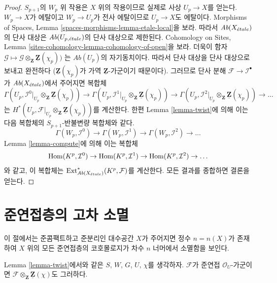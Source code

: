 \begin{proof}
$S_{p + 1}$의 $W_p$ 위 작용은 $X$ 위의 작용이므로 실제로 사상
$U_p \to X$를 얻는다. $W_p \to X$가 에탈이고
$W_p \to U_p$가 전사 에탈이므로 $U_p \to X$도 에탈이다.
Morphisms of Spaces, Lemma \ref{spaces-morphisms-lemma-etale-local}을 보라.
따라서 $\textit{Ab}(X_{\acute{e}tale})$의 단사 대상은
$\textit{Ab}(U_{p, {\acute{e}tale}})$의 단사 대상으로 제한된다.
Cohomology on Sites, Lemma
\ref{sites-cohomology-lemma-cohomology-of-open}을 보라. 더욱이 함자
$\mathcal{G} \mapsto
\mathcal{G} \otimes_\mathbf{Z} \underline{\mathbf{Z}}(\chi_p))$
는 $\textit{Ab}(U_p)$의 자기동치이다. 따라서 단사 대상을 단사
대상으로 보내고 완전하다
($\underline{\mathbf{Z}}(\chi_p)$가 가역
$\underline{\mathbf{Z}}$-가군이기 때문이다). 그러므로 단사 분해
$\mathcal{F} \to \mathcal{I}^\bullet$가 $\textit{Ab}(X_{\acute{e}tale})$에서
주어지면 복합체
$$
\Gamma(U_p,
\mathcal{I}^0|_{U_p} \otimes_\mathbf{Z} \underline{\mathbf{Z}}(\chi_p))
\to
\Gamma(U_p,
\mathcal{I}^1|_{U_p} \otimes_\mathbf{Z} \underline{\mathbf{Z}}(\chi_p))
\to
\Gamma(U_p,
\mathcal{I}^2|_{U_p} \otimes_\mathbf{Z} \underline{\mathbf{Z}}(\chi_p))
\to \ldots
$$
는 $H^*(U_p,
\mathcal{F}|_{U_p} \otimes_\mathbf{Z} \underline{\mathbf{Z}}(\chi_p))$를
계산한다. 한편 Lemma \ref{lemma-twist}에 의해 이는 다음 복합체의
$S_{p + 1}$-반불변량 복합체와 같다.
$$
\Gamma(W_p, \mathcal{I}^0) \to
\Gamma(W_p, \mathcal{I}^1) \to
\Gamma(W_p, \mathcal{I}^2) \to \ldots
$$
Lemma \ref{lemma-compute}에 의해 이는 복합체
$$
\mathop{\mathrm{Hom}}\nolimits(K^p, \mathcal{I}^0) \to
\mathop{\mathrm{Hom}}\nolimits(K^p, \mathcal{I}^1) \to
\mathop{\mathrm{Hom}}\nolimits(K^p, \mathcal{I}^2) \to \ldots
$$
와 같고, 이 복합체는
$\mathop{\mathrm{Ext}}\nolimits^*_{\textit{Ab}(X_{\acute{e}tale})}(K^p, \mathcal{F})$를 계산한다.
모든 결과를 종합하면 결론을 얻는다.
\end{proof}





\section{준연접층의 고차 소멸}
\label{section-higher-vanishing}

\noindent
이 절에서는 준콤팩트하고 준분리인 대수공간 $X$가 주어지면 정수
$n = n(X)$가 존재하여 $X$ 위의 모든 준연접층의 코호몰로지가
차수 $n$ 너머에서 소멸함을 보인다.

\begin{lemma}
\label{lemma-quasi-coherent-twist}
Lemma \ref{lemma-twist}에서와 같은 $S$, $W$, $G$, $U$, $\chi$를
생각하자. $\mathcal{F}$가 준연접 $\mathcal{O}_U$-가군이면
$\mathcal{F} \otimes_{\mathbf{Z}} \underline{\mathbf{Z}}(\chi)$도
그러하다.
\end{lemma}

